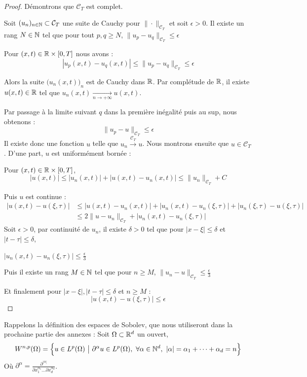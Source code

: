 \begin{proof}
    Démontrons que $\mathcal{C}_T$ est complet. 

    Soit $(u_n)_{n\in \mathbb{N}} \subset \mathcal{C}_T$ une suite de Cauchy pour $\| \cdot \|_{\mathcal{C}_T}$ et soit $\epsilon >0$. 
    Il existe un rang $N \in \mathbb{N}$ tel que pour tout $p,q \geq N$, $\|u_p - u_q\|_{\mathcal{C}_T} \leq \epsilon$

    Pour $(x,t)\in \mathbb{R}\times [0,T]$ nous avons :
    $$|u_p(x,t) - u_q(x,t)| \leq \|u_p - u_q\|_{\mathcal{C}_T} \leq \epsilon$$

    Alors la suite $\big(u_n(x,t)\big)_n$ est de Cauchy dans $\mathbb{R}$. Par complétude de $\mathbb{R}$, il existe $u(x,t)\in \mathbb{R}$ tel que $u_n(x,t) \xrightarrow[n \to +\infty]{}u(x,t)$.

    Par passage à la limite suivant $q$ dans la première inégalité puis au sup, nous obtenons :
    $$\| u_p - u \|_{\mathcal{C}_T} \leq \epsilon$$
    Il existe donc une fonction $u$ telle que $u_n \xrightarrow{\mathcal{C}_T} u $.
    Nous montrons ensuite que $u \in \mathcal{C}_T$. 
    D'une part, $u$ est uniformément bornée :

    Pour $(x,t)\in \mathbb{R} \times [0,T]$,
    $$|u(x,t)| \leq |u_n(x,t)| + |u(x,t) - u_n(x,t)| \leq \|u_n\|_{\mathcal{C}_T} + C$$
    
    Puis $u$ est continue :
    \begin{equation*}
    \begin{split}
        |u(x,t) - u(\xi,\tau)| &\leq |u(x,t) - u_n(x,t)| + |u_n(x,t) - u_n(\xi,\tau)| + |u_n(\xi,\tau) - u(\xi,\tau)| \\
        &\leq 2\| u - u_n \|_{\mathcal{C}_T} + |u_n(x,t) - u_n(\xi,\tau)|
    \end{split}
    \end{equation*}
    Soit $\epsilon > 0$, par continuité de $u_n$, il existe $\delta > 0$ tel que pour $|x- \xi| \leq \delta$ et $|t - \tau| \leq \delta$, 
    
    $|u_n(x,t) - u_n(\xi,\tau)| \leq \frac{\epsilon}{3}$

    Puis il existe un rang $M \in \mathbb{N}$ tel que pour $n \geq M$, $\|u_n - u\|_{\mathcal{C}_T} \leq \frac{\epsilon}{3}$

    Et finalement pour $|x - \xi|,|t - \tau| \leq \delta$ et $n \geq M$ :
    $$|u(x,t) - u(\xi,\tau)| \leq \epsilon$$

\end{proof}

Rappelons la définition des espaces de Sobolev, que nous utiliseront dans la prochaine partie des annexes :
Soit $\Omega \subset \mathbb{R}^d$ un ouvert,
$$W^{n,p}(\Omega) = \Big\{ u \in L^p(\Omega) \ \big| \ \partial^{\alpha}u \in L^p(\Omega), \ \forall \alpha \in \N^d, \ |\alpha| = \alpha_1 + \dots + \alpha_d = n \Big\}$$
Où $\partial^{\alpha} = \frac{\partial^{|\alpha|}}{\partial x_1^{\alpha_1} \dots \partial x_d^{\alpha_d}} $.

